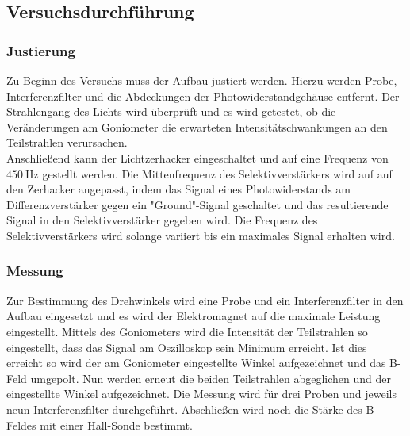 \subsection{Versuchsdurchführung}
\subsubsection{Justierung}
Zu Beginn des Versuchs muss der Aufbau justiert werden. Hierzu werden Probe, Interferenzfilter und die Abdeckungen der Photowiderstandgehäuse entfernt. Der Strahlengang des Lichts wird überprüft und es wird getestet, ob die Veränderungen am Goniometer die erwarteten Intensitätschwankungen an den Teilstrahlen verursachen.\\
Anschließend kann der Lichtzerhacker eingeschaltet und auf eine Frequenz von $\SI{450}{\Hz}$ gestellt werden. Die Mittenfrequenz des Selektivverstärkers wird auf auf den Zerhacker angepasst, indem das Signal eines Photowiderstands am Differenzverstärker gegen ein "Ground"-Signal geschaltet und das resultierende Signal in den Selektivverstärker gegeben wird. Die Frequenz des Selektivverstärkers wird solange variiert bis ein maximales Signal erhalten wird.
\subsubsection{Messung}
Zur Bestimmung des Drehwinkels wird eine Probe und ein Interferenzfilter in den Aufbau eingesetzt und es wird der Elektromagnet auf die maximale Leistung eingestellt. Mittels des Goniometers wird die Intensität der Teilstrahlen so eingestellt, dass das Signal am Oszilloskop sein Minimum erreicht. Ist dies erreicht so wird der am Goniometer eingestellte Winkel aufgezeichnet und das B-Feld umgepolt. Nun werden erneut die beiden Teilstrahlen abgeglichen und der eingestellte Winkel aufgezeichnet. Die Messung wird für drei Proben und jeweils neun Interferenzfilter durchgeführt. Abschließen wird noch die Stärke des B-Feldes mit einer Hall-Sonde bestimmt.
